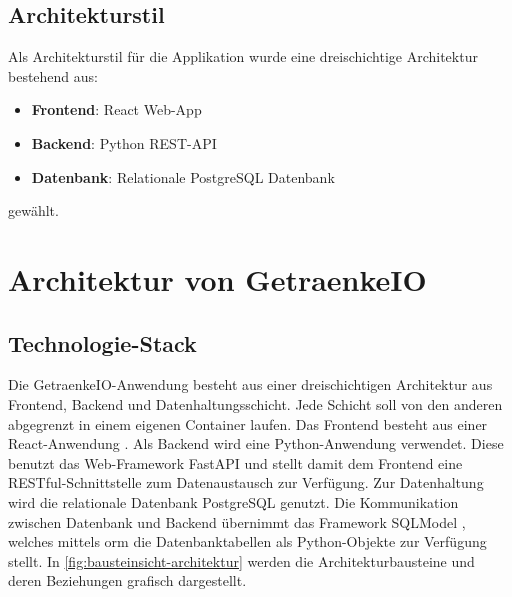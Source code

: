 \documentclass[conference,a4paper]{cs-techrep}
\begin{document}
\subsection{Architekturstil}
Als Architekturstil für die Applikation wurde eine dreischichtige Architektur bestehend aus:
\begin{itemize}
	\item \textbf{Frontend}: React Web-App
	\item \textbf{Backend}: Python REST-API
	\item \textbf{Datenbank}: Relationale PostgreSQL Datenbank
\end{itemize}
gewählt.

\section{Architektur von GetraenkeIO} %

\subsection{Technologie-Stack} %
Die GetraenkeIO-Anwendung besteht aus einer dreischichtigen Architektur aus Frontend, Backend und Datenhaltungsschicht.
Jede Schicht soll von den anderen abgegrenzt in einem eigenen Container \cite{conatiners} laufen.
Das Frontend besteht aus einer React-Anwendung \cite{react}.
Als Backend wird eine Python-Anwendung \cite{python} verwendet.
Diese benutzt das Web-Framework FastAPI \cite{fastapi} und stellt damit dem Frontend eine RESTful-Schnittstelle \cite{restful} zum Datenaustausch zur Verfügung.
Zur Datenhaltung wird die relationale Datenbank PostgreSQL \cite{postgresql} genutzt.
Die Kommunikation zwischen Datenbank und Backend übernimmt das Framework SQLModel \cite{sqlmodel}, welches mittels \ac{orm} die Datenbanktabellen als Python-Objekte zur Verfügung stellt. In \autoref{fig:bausteinsicht-architektur} werden die Architekturbausteine und deren Beziehungen grafisch dargestellt.
\end{document}
